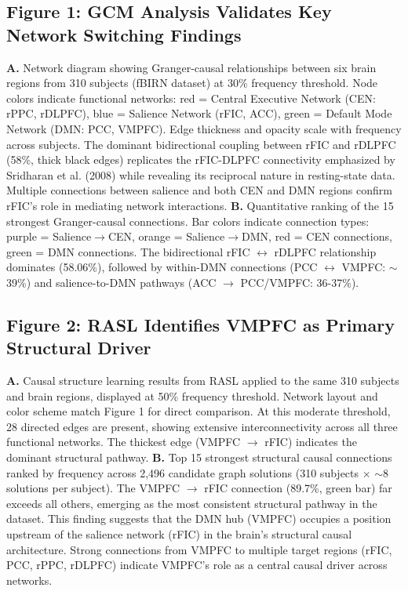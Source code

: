 
\subsection*{Figure 1: GCM Analysis Validates Key Network Switching Findings}

\textbf{A.} Network diagram showing Granger-causal relationships between six brain regions from 310 subjects (fBIRN dataset) at 30\% frequency threshold. Node colors indicate functional networks: red = Central Executive Network (CEN: rPPC, rDLPFC), blue = Salience Network (rFIC, ACC), green = Default Mode Network (DMN: PCC, VMPFC). Edge thickness and opacity scale with frequency across subjects. The dominant bidirectional coupling between rFIC and rDLPFC (58\%, thick black edges) replicates the rFIC-DLPFC connectivity emphasized by Sridharan et al. (2008) while revealing its reciprocal nature in resting-state data. Multiple connections between salience and both CEN and DMN regions confirm rFIC's role in mediating network interactions. \textbf{B.} Quantitative ranking of the 15 strongest Granger-causal connections. Bar colors indicate connection types: purple = Salience$\rightarrow$CEN, orange = Salience$\rightarrow$DMN, red = CEN connections, green = DMN connections. The bidirectional rFIC $\leftrightarrow$ rDLPFC relationship dominates (58.06\%), followed by within-DMN connections (PCC $\leftrightarrow$ VMPFC: $\sim$39\%) and salience-to-DMN pathways (ACC $\rightarrow$ PCC/VMPFC: 36-37\%).

\subsection*{Figure 2: RASL Identifies VMPFC as Primary Structural Driver}

\textbf{A.} Causal structure learning results from RASL applied to the same 310 subjects and brain regions, displayed at 50\% frequency threshold. Network layout and color scheme match Figure 1 for direct comparison. At this moderate threshold, 28 directed edges are present, showing extensive interconnectivity across all three functional networks. The thickest edge (VMPFC $\rightarrow$ rFIC) indicates the dominant structural pathway. \textbf{B.} Top 15 strongest structural causal connections ranked by frequency across 2,496 candidate graph solutions (310 subjects $\times$ $\sim$8 solutions per subject). The VMPFC $\rightarrow$ rFIC connection (89.7\%, green bar) far exceeds all others, emerging as the most consistent structural pathway in the dataset. This finding suggests that the DMN hub (VMPFC) occupies a position upstream of the salience network (rFIC) in the brain's structural causal architecture. Strong connections from VMPFC to multiple target regions (rFIC, PCC, rPPC, rDLPFC) indicate VMPFC's role as a central causal driver across networks.

